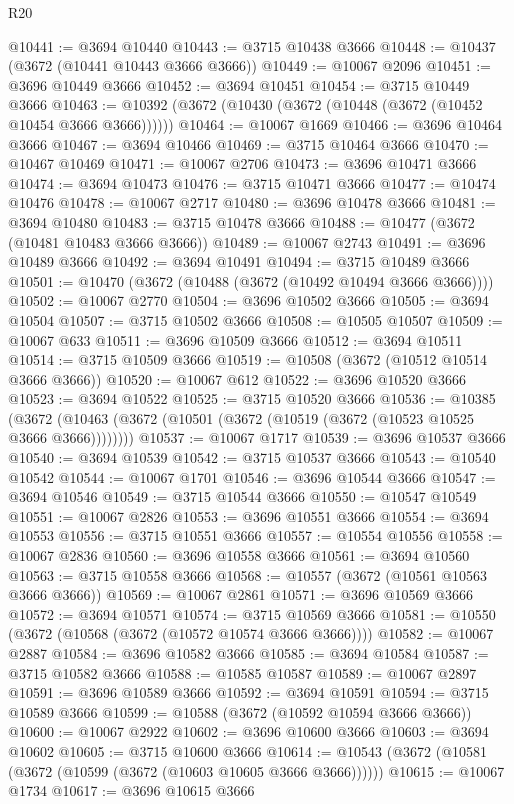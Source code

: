 \begin{lexlean}{R20}
\begin{coremodule}
@10441 := @3694 @10440
@10443 := @3715 @10438 @3666
@10448 := @10437 (@3672 (@10441 @10443 @3666 @3666))
@10449 := @10067 @2096
@10451 := @3696 @10449 @3666
@10452 := @3694 @10451
@10454 := @3715 @10449 @3666
@10463 := @10392 (@3672 (@10430 (@3672 (@10448 (@3672 (@10452 @10454 @3666 @3666))))))
@10464 := @10067 @1669
@10466 := @3696 @10464 @3666
@10467 := @3694 @10466
@10469 := @3715 @10464 @3666
@10470 := @10467 @10469
@10471 := @10067 @2706
@10473 := @3696 @10471 @3666
@10474 := @3694 @10473
@10476 := @3715 @10471 @3666
@10477 := @10474 @10476
@10478 := @10067 @2717
@10480 := @3696 @10478 @3666
@10481 := @3694 @10480
@10483 := @3715 @10478 @3666
@10488 := @10477 (@3672 (@10481 @10483 @3666 @3666))
@10489 := @10067 @2743
@10491 := @3696 @10489 @3666
@10492 := @3694 @10491
@10494 := @3715 @10489 @3666
@10501 := @10470 (@3672 (@10488 (@3672 (@10492 @10494 @3666 @3666))))
@10502 := @10067 @2770
@10504 := @3696 @10502 @3666
@10505 := @3694 @10504
@10507 := @3715 @10502 @3666
@10508 := @10505 @10507
@10509 := @10067 @633
@10511 := @3696 @10509 @3666
@10512 := @3694 @10511
@10514 := @3715 @10509 @3666
@10519 := @10508 (@3672 (@10512 @10514 @3666 @3666))
@10520 := @10067 @612
@10522 := @3696 @10520 @3666
@10523 := @3694 @10522
@10525 := @3715 @10520 @3666
@10536 := @10385
    (@3672 (@10463 (@3672 (@10501 (@3672 (@10519 (@3672 (@10523 @10525 @3666 @3666))))))))
@10537 := @10067 @1717
@10539 := @3696 @10537 @3666
@10540 := @3694 @10539
@10542 := @3715 @10537 @3666
@10543 := @10540 @10542
@10544 := @10067 @1701
@10546 := @3696 @10544 @3666
@10547 := @3694 @10546
@10549 := @3715 @10544 @3666
@10550 := @10547 @10549
@10551 := @10067 @2826
@10553 := @3696 @10551 @3666
@10554 := @3694 @10553
@10556 := @3715 @10551 @3666
@10557 := @10554 @10556
@10558 := @10067 @2836
@10560 := @3696 @10558 @3666
@10561 := @3694 @10560
@10563 := @3715 @10558 @3666
@10568 := @10557 (@3672 (@10561 @10563 @3666 @3666))
@10569 := @10067 @2861
@10571 := @3696 @10569 @3666
@10572 := @3694 @10571
@10574 := @3715 @10569 @3666
@10581 := @10550 (@3672 (@10568 (@3672 (@10572 @10574 @3666 @3666))))
@10582 := @10067 @2887
@10584 := @3696 @10582 @3666
@10585 := @3694 @10584
@10587 := @3715 @10582 @3666
@10588 := @10585 @10587
@10589 := @10067 @2897
@10591 := @3696 @10589 @3666
@10592 := @3694 @10591
@10594 := @3715 @10589 @3666
@10599 := @10588 (@3672 (@10592 @10594 @3666 @3666))
@10600 := @10067 @2922
@10602 := @3696 @10600 @3666
@10603 := @3694 @10602
@10605 := @3715 @10600 @3666
@10614 := @10543 (@3672 (@10581 (@3672 (@10599 (@3672 (@10603 @10605 @3666 @3666))))))
@10615 := @10067 @1734
@10617 := @3696 @10615 @3666

\end{coremodule}
\end{lexlean}
